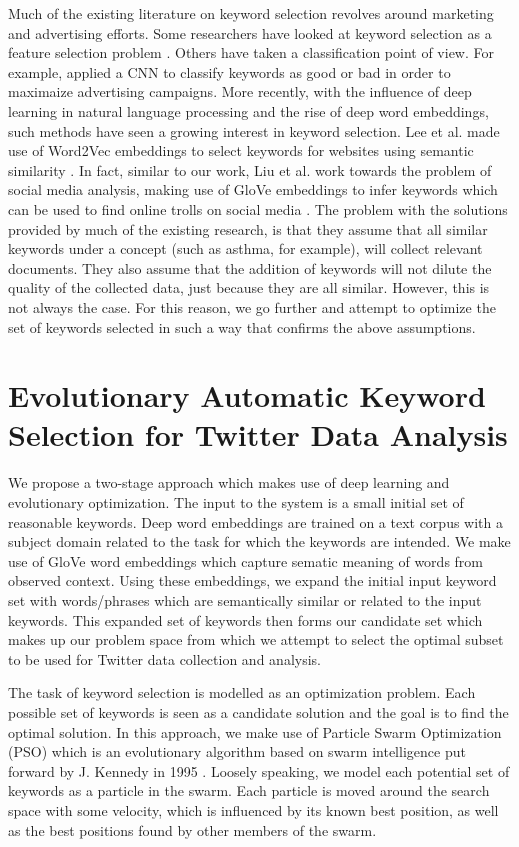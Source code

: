 \documentclass[runningheads]{llncs}
\begin{document}
Much of the existing literature on keyword selection revolves around marketing and advertising efforts. Some researchers have looked at keyword selection as a feature selection problem \cite{HREF1}. Others have taken a classification point of view. For example, \cite{HREF2} applied a CNN to classify keywords as good or bad in order to maximaize advertising campaigns. More recently, with the influence of deep learning in natural language processing and the rise of deep word embeddings, such methods have seen a growing interest in keyword selection. Lee et al. made use of Word2Vec embeddings to select keywords for websites using semantic similarity  \cite{HREF3}. In fact, similar to our work, Liu et al. work towards the problem of social media analysis, making use of GloVe embeddings to infer keywords which can be used to find online trolls on social media \cite{HREF4}. The problem with the solutions provided by much of the existing research, is that they assume that all similar keywords under a concept (such as asthma, for example), will collect relevant documents. They also assume that the addition of keywords will not dilute the quality of the collected data, just because they are all similar. However, this is not always the case. For this reason, we go further and attempt to optimize the set of keywords selected in such a way that confirms the above assumptions. 

\section{Evolutionary Automatic Keyword Selection for Twitter Data Analysis}
We propose a two-stage approach which makes use of deep learning and evolutionary optimization. The input to the system is a small initial set of reasonable keywords. Deep word embeddings are trained on a text corpus with a subject domain related to the task for which the keywords are intended. We make use of GloVe \cite{REF13} word embeddings which capture sematic meaning of words from observed context. Using these embeddings, we expand the initial input keyword set with words/phrases which are semantically similar or related to the input keywords. This expanded set of keywords then forms our candidate set which makes up our problem space from which we attempt to select the optimal subset to be used for Twitter data collection and analysis.

The task of keyword selection is modelled as an optimization problem. Each possible set of keywords is seen as a candidate solution and the goal is to find the optimal solution. In this approach, we make use of Particle Swarm Optimization (PSO) which is an evolutionary algorithm based on swarm intelligence put forward by J. Kennedy in 1995 \cite{K_REF7}. Loosely speaking, we model each potential set of keywords as a particle in the swarm. Each particle is moved around the search space with some velocity, which is influenced by its known best position, as well as the best positions found by other members of the swarm. 
\end{document}
